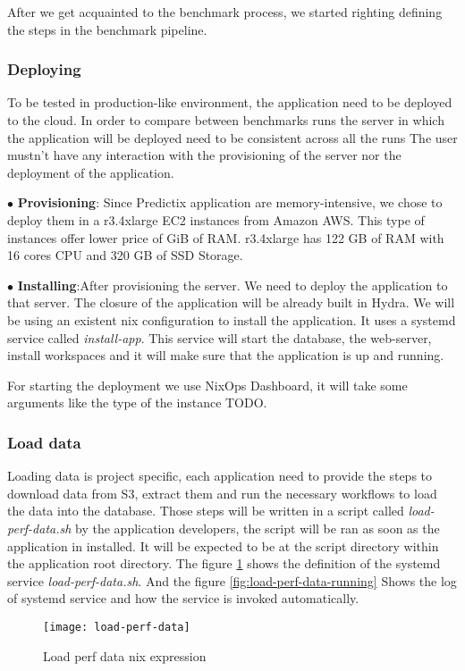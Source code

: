 After we get acquainted to the benchmark process, we started righting defining
the steps in the benchmark pipeline.
\subsubsection{Deploying}
To be tested in production-like environment, the
application need to be deployed to the cloud. In order to compare between
benchmarks runs the server in which the application will be deployed need to be
consistent across all the runs The user mustn't have any interaction with the
provisioning of the server nor the deployment of the application. 

$\bullet$ \textbf{Provisioning}: Since Predictix application are
memory-intensive, we chose to deploy them in a r3.4xlarge EC2 instances from
Amazon AWS. This type of instances offer lower price of GiB of RAM. r3.4xlarge
has 122 GB of RAM with 16 cores CPU and 320 GB of SSD Storage.

$\bullet$ \textbf{Installing}:After provisioning the server. We need to deploy
the application to that server. The closure of the application will be already
built in Hydra. We will be using an existent nix configuration to install the
application. It uses a systemd service called \emph{install-app}. This service
will start the database, the web-server, install workspaces and it will make
sure that the application is up and running.

For starting the deployment we use NixOps Dashboard, it will take
some arguments like the type of the instance TODO.

\subsubsection{Load data}
Loading data is project specific, each application need to provide the steps to
download data from S3, extract them and run the necessary workflows to load the
data into the database. Those steps will be written in a script called
\emph{load-perf-data.sh} by the application developers, the script will be ran as
soon as the application in installed. It will be expected to be at the script
directory within the application root directory. The figure
\hyperref[fig:load-perf-data]{\ref{fig:load-perf-data}} shows the definition of
the systemd service \emph{load-perf-data.sh}. And the figure
\hyperref[fig:load-perf-data-running]{\ref{fig:load-perf-data-running}} Shows
the log of systemd service and how the service is invoked automatically.
\begin{figure}[h]
  \texttt{[image: load-perf-data]}
\caption{Load perf data nix expression}
\label{fig:load-perf-data}
\end{figure}

